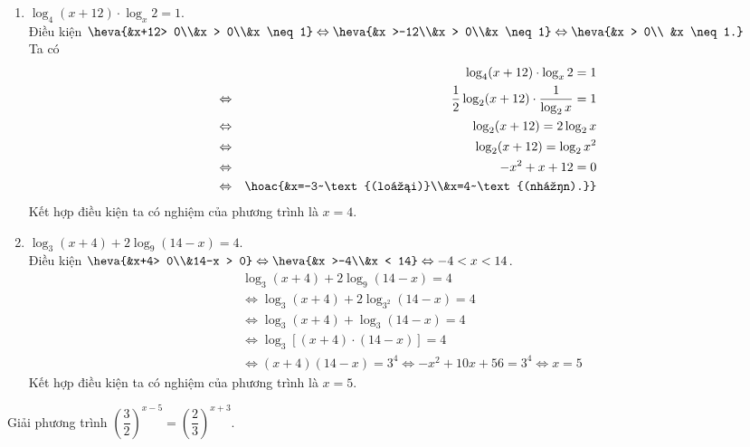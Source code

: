\begin{ex}
{\begin{enumerate}
			\item  $\log_4(x+12) \cdot \log_x 2=1$.\\
			Điều kiện $\heva{&x+12> 0\\&x > 0\\&x \neq 1} \Leftrightarrow \heva{&x >-12\\&x > 0\\&x \neq 1}\Leftrightarrow  \heva{&x > 0\\
			 &x \neq 1.}$\\
			Ta  có
			 \allowdisplaybreaks
			\begin{eqnarray*}
				 && \log_4(x+12) \cdot \log_x 2=1
				 \\
				&\Leftrightarrow& \dfrac{1}{2} \log_2(x+12)  \cdot \dfrac{1}{\log_2 x}=1
				\\ 
				&\Leftrightarrow& \log_2(x+12)=2 \log_2 x 
				 \\
				&\Leftrightarrow&  \log_2(x+12)=\log_2 x^2
				 \\
				&\Leftrightarrow&-x^2+x+12=0 
				 \\
				&\Leftrightarrow&\hoac{&x=-3~\text{(loại)}\\&x=4~\text{(nhận).}} 
			\end{eqnarray*}
			 Kết hợp điều kiện ta có nghiệm của phương trình là $x=4$.
			\item  $\log_3(x+4)+2\log_9(14-x)=4$.\\
			Điều kiện $\heva{&x+4> 0\\&14-x > 0} \Leftrightarrow\heva{&x >-4\\&x < 14} \Leftrightarrow-4< x <  14$.
			 $$
			\begin{aligned}
				& \log_3(x+4)+2\log_9(14-x)=4 \\ 
				& \Leftrightarrow \log_3(x+4)+2 \log  _{3^2}(14-x)=4 \\
				&  \Leftrightarrow \log_3(x+4)+\log_3(14-x)=4 \\
				&  \Leftrightarrow \log_3[(x+4) \cdot(14-x)]=4 \\
				&  \Leftrightarrow(x+4)(14-x)=3^4 \Leftrightarrow-x^2+10 x+56=3^4 \Leftrightarrow x=5
			\end{aligned}
			 $$
			Kết  hợp điều kiện ta có nghiệm của phương trình là $x=5$.
		\end{enumerate}
	 }
\end{ex}

\begin{ex}%
	Giải phương trình $\left(\dfrac{3}{2} \right)^{x-5}=\left(\dfrac{2}{3}  \right)^{x+3}$.
\end{ex}

